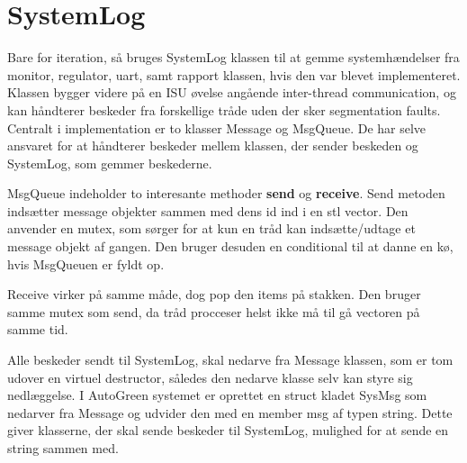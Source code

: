 \section{SystemLog} \label{sec:Systemlog_impl}

Bare for iteration, så bruges SystemLog klassen til at gemme systemhændelser fra monitor, regulator, uart, samt rapport klassen, hvis den var blevet implementeret. Klassen bygger videre på en ISU øvelse angående inter-thread communication, og kan håndterer beskeder fra forskellige tråde uden der sker segmentation faults. Centralt i implementation er to klasser Message og MsgQueue. De har selve ansvaret for at håndterer beskeder mellem klassen, der sender beskeden og SystemLog, som gemmer beskederne.     



MsgQueue indeholder to interesante methoder \textbf{send} og \textbf{receive}. Send metoden indsætter message objekter sammen med dens id ind i en stl vector. Den anvender en mutex, som sørger for at kun en tråd kan indsætte/udtage et message objekt af gangen. Den bruger desuden en conditional til at danne en kø, hvis MsgQueuen er fyldt op.

\clearpage



Receive virker på samme måde, dog pop den items på stakken. Den bruger samme mutex som send, da tråd procceser helst ikke må til gå vectoren på samme tid.



Alle beskeder sendt til SystemLog, skal nedarve fra Message klassen, som er tom udover en virtuel destructor, således den nedarve klasse selv kan styre sig nedlæggelse. I AutoGreen systemet er oprettet en struct kladet SysMsg som nedarver fra Message og udvider den med en member msg af typen string. Dette giver klasserne, der skal sende beskeder til SystemLog, mulighed for at sende en string sammen med. 



